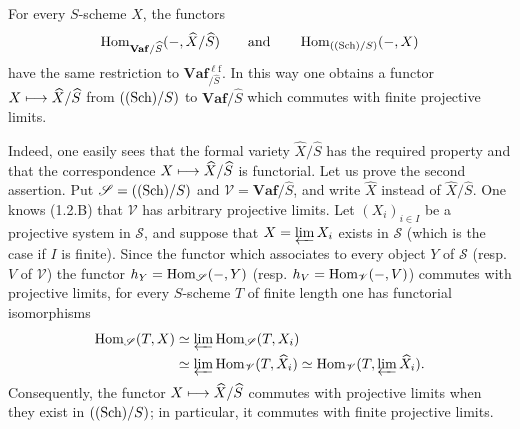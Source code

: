 \begin{proposition}{}
For every $S$-scheme $X$, the functors
\[
\operatorname{Hom}_{\mathbf{Vaf}/\widehat S}(-,\widehat X/\widehat S)\qquad\text{and}\qquad\operatorname{Hom}_{(\textup{(Sch)}/S)}(-,X)
\]
have the same restriction to $\mathbf{Vaf}_{/\widehat S}^{\ell\mathrm f}$. In this way one obtains a functor $X\longmapsto\widehat X/\widehat S$ from $(\textup{(Sch)}/S)$ to $\mathbf{Vaf}/\widehat S$ which commutes with finite projective limits.
\end{proposition}
Indeed, one easily sees that the formal variety $\widehat X/\widehat S$ has the required property and that the correspondence $X\longmapsto\widehat X/\widehat S$ is functorial. Let us prove the second assertion.
Put $\mathscr S=(\textup{(Sch)}/S)$ and $\mathscr V=\mathbf{Vaf}/\widehat S$, and write $\widehat X$ instead of $\widehat X/\widehat S$. One knows (1.2.B) that $\mathscr V$ has arbitrary projective limits. Let $(X_i)_{i\in I}$ be a projective system in $\mathscr S$, and suppose that $X=\varprojlim X_i$ exists in $\mathscr S$ (which is the case if $I$ is finite). Since the functor which associates to every object $Y$ of $\mathscr S$ (resp. $V$ of $\mathscr V$) the functor $h_Y=\operatorname{Hom}_{\mathscr S}(-,Y)$ (resp. $h_V=\operatorname{Hom}_{\mathscr V}(-,V)$) commutes with projective limits, for every $S$-scheme $T$ of finite length one has functorial isomorphisms
\[
\begin{aligned}
\operatorname{Hom}_{\mathscr S}(T,X)&\simeq\varprojlim\operatorname{Hom}_{\mathscr S}(T,X_i)\\
&\simeq\varprojlim\operatorname{Hom}_{\mathscr V}(T,\widehat X_i)\simeq\operatorname{Hom}_{\mathscr V}(T,\varprojlim\widehat X_i).
\end{aligned}
\]
Consequently, the functor $X\longmapsto\widehat X/\widehat S$ commutes with projective limits when they exist in $(\textup{(Sch)}/S)$; in particular, it commutes with finite projective limits.

